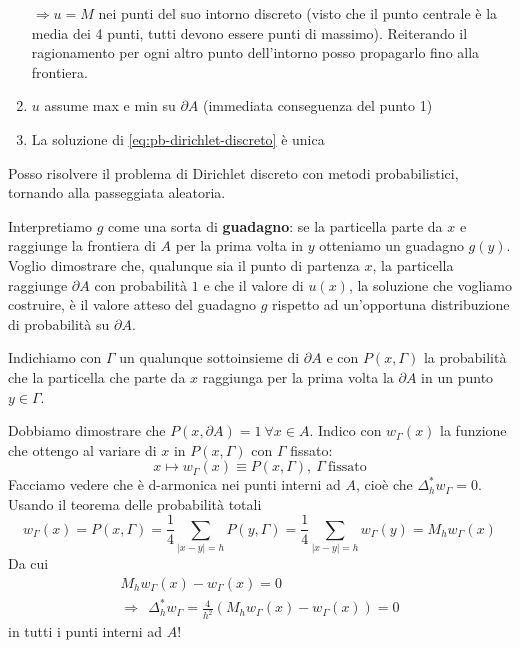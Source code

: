 \documentclass[10pt,a4paper,twoside,openright]{book}
\begin{document}
\begin{enumerate}
\begin{figure}[htpb]
\begin{tikzpicture}[x=0.75pt,y=0.75pt,yscale=-1,xscale=1]
	      	\end{tikzpicture}
		\end{figure}
		\FloatBarrier
		$\displaystyle \Rightarrow u=M$ nei punti del suo intorno discreto (visto che il punto centrale è la media dei 4 punti, tutti devono essere punti di massimo). Reiterando il ragionamento per ogni altro punto dell'intorno posso propagarlo fino alla frontiera.
	\item $\displaystyle u$ assume max e min su $\displaystyle \partial A$ (immediata conseguenza del punto 1)
	\item La soluzione di \eqref{eq:pb-dirichlet-discreto} è unica
\end{enumerate}
Posso risolvere il problema di Dirichlet discreto con metodi probabilistici, tornando alla passeggiata aleatoria. 

Interpretiamo $\displaystyle g$ come una sorta di \textbf{guadagno}: se la particella parte da $\displaystyle x$ e raggiunge la frontiera di $\displaystyle A$ per la prima volta in $\displaystyle y$ otteniamo un guadagno $\displaystyle g(y)$. Voglio dimostrare che, qualunque sia il punto di partenza $\displaystyle x$, la particella raggiunge $\displaystyle \partial A$ con probabilità $\displaystyle 1$ e che il valore di $\displaystyle u(x)$, la soluzione che vogliamo costruire, è il valore atteso del guadagno $\displaystyle g$ rispetto ad un'opportuna distribuzione di probabilità su $\displaystyle \partial A$. 

Indichiamo con $\displaystyle \Gamma $ un qualunque sottoinsieme di $\displaystyle \partial A$ e con $\displaystyle P(x,\Gamma)$ la probabilità che la particella che parte da $\displaystyle x$ raggiunga per la prima volta la $\displaystyle \partial A$ in un punto $\displaystyle y\in \Gamma $. 

Dobbiamo dimostrare che $\displaystyle P(x,\partial A) =1\ \forall x\in A$. Indico con $\displaystyle w_{\Gamma }(x)$ la funzione che ottengo al variare di $\displaystyle x$ in $\displaystyle P(x,\Gamma)$ con $\displaystyle \Gamma $ fissato:
\begin{equation*}
	x\longmapsto w_{\Gamma }(x) \equiv P(x,\Gamma),\ \Gamma \ \text{fissato}
\end{equation*}
Facciamo vedere che è d-armonica nei punti interni ad $\displaystyle A$, cioè che $\displaystyle \Delta ^{*}_{h} w_{\Gamma } =0$. Usando il teorema delle probabilità totali
\begin{equation*}
	w_{\Gamma }(x) =P(x,\Gamma) =\frac{1}{4}\sum _{| x-y| =h} P(y,\Gamma) =\frac{1}{4}\sum _{| x-y| =h} w_{\Gamma }(y) =M_{h} w_{\Gamma }(x)
\end{equation*}
Da cui
\begin{gather*}
	M_{h} w_{\Gamma }(x) -w_{\Gamma }(x) =0\\
	\Rightarrow \ \ \Delta ^{*}_{h} w_{\Gamma } =\frac{4}{h^{2}}( M_{h} w_{\Gamma }(x) -w_{\Gamma }(x)) =0
\end{gather*}
in tutti i punti interni ad $\displaystyle A$! 
\end{document}
